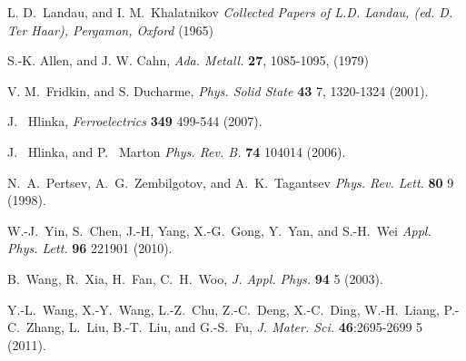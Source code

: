 \documentclass[22pt]{article} %
\begin{document}
\begin{thebibliography}{1}
L. D.~Landau, and I. M.~Khalatnikov
\newblock \emph{Collected Papers  of L.D.  Landau, (ed.  D. Ter  Haar), Pergamon,  Oxford} (1965)

S.-K. Allen, and J. W. Cahn,
\newblock \emph{Ada. Metall.} \textbf{27}, 1085-1095, (1979)


V. M.~Fridkin, and S. Ducharme,
\newblock \emph{Phys. Solid State} \textbf{43} 7, 1320-1324 (2001).

J. ~Hlinka,
\newblock \emph{Ferroelectrics} \textbf{349} 499-544 (2007).


J. ~Hlinka, and P. ~Marton
\newblock \emph{Phys. Rev. B.} \textbf{74} 104014 (2006).

N.~A.~Pertsev, A.~G.~Zembilgotov, and A.~K.~Tagantsev
\newblock \emph{Phys. Rev. Lett.} \textbf{80} 9 (1998).

W.-J.~Yin, S.~Chen, J.-H, Yang, X.-G.~Gong, Y.~Yan, and S.-H.~Wei
\newblock \emph{Appl. Phys. Lett.} \textbf{96} 221901 (2010).


B.~Wang, R.~Xia, H.~Fan, C.~H.~Woo,
\newblock \emph{J. Appl. Phys.} \textbf{94} 5 (2003).

Y.-L.~Wang, X.-Y.~Wang, L.-Z.~Chu, Z.-C.~Deng, X.-C.~Ding, W.-H.~Liang, P.-C.~Zhang, L.~Liu, B.-T.~Liu, and G.-S.~Fu,
\newblock \emph{J. Mater. Sci.} \textbf{46}:2695-2699 5 (2011).

\end{thebibliography}


\end{document}
